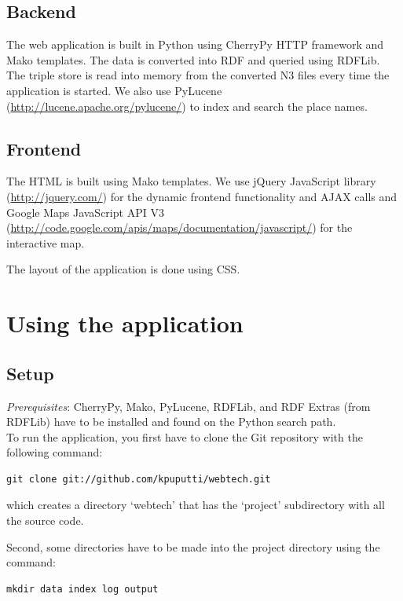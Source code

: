 \documentclass[a4paper,12pt]{article}
\begin{document}
\subsection{Backend}

The web application is built in Python using CherryPy HTTP framework
and Mako templates. The data is converted into RDF and queried using
RDFLib. The triple store is read into memory from the converted N3
files every time the application is started. We also use PyLucene
(\url{http://lucene.apache.org/pylucene/}) to index and search the
place names.

\subsection{Frontend}

The HTML is built using Mako templates. We use jQuery JavaScript
library (\url{http://jquery.com/}) for the dynamic frontend
functionality and AJAX calls and Google Maps JavaScript API V3
(\url{http://code.google.com/apis/maps/documentation/javascript/}) for
the interactive map.

The layout of the application is done using CSS.

\section{Using the application}

\subsection{Setup}

\noindent \textit{Prerequisites}: CherryPy, Mako, PyLucene, RDFLib,
and RDF Extras (from RDFLib) have to be installed and found on the
Python search path.\\

\noindent To run the application, you first have to clone the Git
repository with the following command:

\begin{verbatim}
git clone git://github.com/kpuputti/webtech.git
\end{verbatim}

\noindent which creates a directory `webtech' that has the `project'
subdirectory with all the source code.

Second, some directories have to be made into the project directory
using the command:

\begin{verbatim}
mkdir data index log output
\end{verbatim}
\end{document}
